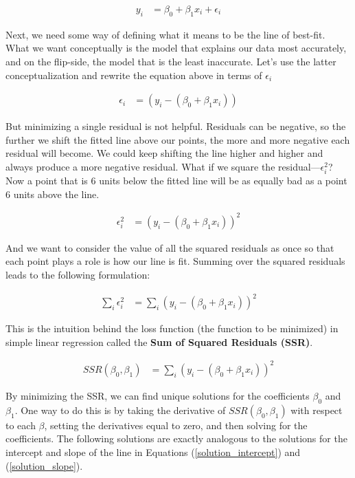 \documentclass[10pt]{article}\usepackage[]{graphicx}\usepackage[]{color}
\begin{document}
\begin{align}
y_i &= \beta_0 + \beta_1 x_i + \epsilon_i
\end{align}

Next, we need some way of defining what it means to be the line of best-fit. What we want conceptually is the model that explains our data most accurately, and on the flip-side, the model that is the least inaccurate. Let's use the latter conceptualization and rewrite the equation above in terms of $\epsilon_i$

\begin{align}
\epsilon_i &=  ( y_i -  (\beta_0 + \beta_1 x_i) )
\end{align}

But minimizing a single residual is not helpful. Residuals can be negative, so the further we shift the fitted line above our points, the more and more negative each residual will become. We could keep shifting the line higher and higher and always produce a more negative residual. What if we square the residual---$\epsilon^2_i$? Now a point that is 6 units below the fitted line will be as equally bad as a point 6 units above the line.  

\begin{align}
\epsilon^2_i &=  ( y_i -  (\beta_0 + \beta_1 x_i) )^2
\end{align}

And we want to consider the value of all the squared residuals as once so that each point plays a role is how our line is fit. Summing over the squared residuals leads to the following formulation:

\begin{align}
\sum_i \epsilon^2_i &=  \sum_i ( y_i -  (\beta_0 + \beta_1 x_i) )^2
\end{align}

This is the intuition behind the loss function (the function to be minimized) in simple linear regression called the \textbf{Sum of Squared Residuals (SSR)}.

\begin{align}
SSR(\beta_0, \beta_1) &= \sum_i ( y_i -  (\beta_0 + \beta_1 x_i) )^2
\end{align}

By minimizing the SSR, we can find unique solutions for the coefficients $\beta_0$ and $\beta_1$. One way to do this is by taking the derivative of $SSR(\beta_0, \beta_1)$ with respect to each $\beta$, setting the derivatives equal to zero, and then solving for the coefficients. The following solutions are exactly analogous to the solutions for the intercept and slope of the line in Equations (\ref{solution_intercept}) and (\ref{solution_slope}).
\end{document}
